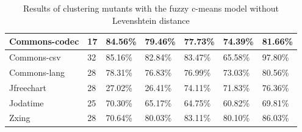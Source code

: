 \documentclass[conference,draftclsnofoot,onecolumn]{IEEEtran}
\begin{document}
\begin{table}[ht]
\begin{tabular}{|l|l|l|l|l|l|l|}
Commons-codec         & 17                   & 84.56\%                           & 79.46\%                                                & 77.73\%                            & 74.39\%                                                                                                                                    & 81.66\%                                                                                                                                    \\ \hline
Commons-csv           & 32                   & 85.16\%                           & 82.84\%                                                & 83.47\%                            & 65.58\%                                                                                                                                    & 97.80\%                                                                                                                                    \\ \hline
Commons-lang          & 28                   & 78.31\%                           & 76.83\%                                                & 76.99\%                            & 73.03\%                                                                                                                                    & 80.56\%                                                                                                                                    \\ \hline
Jfreechart            & 28                   & 27.02\%                           & 26.41\%                                                & 74.11\%                            & 71.83\%                                                                                                                                    & 76.36\%                                                                                                                                    \\ \hline
Jodatime              & 25                   & 70.30\%                           & 65.17\%                                                & 64.75\%                            & 60.82\%                                                                                                                                    & 69.81\%                                                                                                                                    \\ \hline
Zxing                 & 28                   & 70.64\%                           & 80.03\%                                                & 83.11\%                            & 80.10\%                                                                                                                                    & 86.03\%                                                                                                                                    \\ \hline
\end{tabular}
\caption{\label{tab:ml_no_distance}Results of clustering mutants with the fuzzy c-means model without Levenshtein distance}
\end{table}
\end{document}
